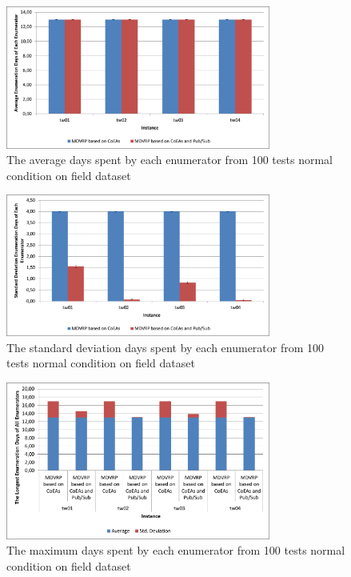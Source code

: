 \documentclass[conference]{IEEEtran}
\begin{document}
\begin{figure}[!]
	\centering
	\includegraphics[width=8.7cm]{Resources/Images/test_result_real_tw_mean_of_total_time_en}
	\caption{The average days spent by each enumerator from 100 tests normal condition on field dataset}
	\label{fig:test_result_real_tw_mean_of_total_time}
\end{figure}

\begin{figure}[!]
	\centering
	\includegraphics[width=8.7cm]{Resources/Images/test_result_real_tw_stdev_of_total_time_en}
	\caption{The standard deviation days spent by each enumerator from 100 tests normal condition on field dataset}
	\label{fig:test_result_real_tw_stdev_of_total_time}
\end{figure}

\begin{figure}[!]
	\centering
	\includegraphics[width=8.7cm]{Resources/Images/test_result_real_tw_mean_stdev_of_total_time_en}
	\caption{The maximum days spent by each enumerator from 100 tests normal condition on field dataset}
	\label{fig:test_result_real_tw_mean_stdev_of_total_time}
\end{figure}
\end{document}
